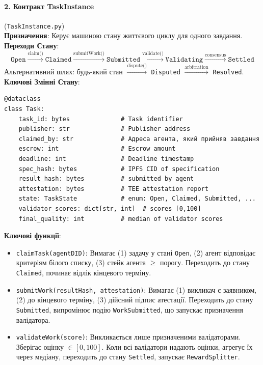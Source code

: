 \documentclass[11pt]{article}
\begin{document}
\paragraph{2. Контракт TaskInstance} (\texttt{TaskInstance.py})\\
\textbf{Призначення}: Керує машиною стану життєвого циклу для одного завдання.\\
\textbf{Переходи Стану}:
\begin{equation}
\texttt{Open} \xrightarrow{\text{claim()}} \texttt{Claimed} \xrightarrow{\text{submitWork()}} \texttt{Submitted} \xrightarrow{\text{validate()}} \texttt{Validating} \xrightarrow{\text{consensus}} \texttt{Settled}
\end{equation}
Альтернативний шлях: будь-який стан $\xrightarrow{\text{dispute()}}$ \texttt{Disputed} $\xrightarrow{\text{arbitration}}$ \texttt{Resolved}.\\
\textbf{Ключові Змінні Стану}:
\begin{verbatim}
@dataclass
class Task:
    task_id: bytes              # Task identifier
    publisher: str              # Publisher address
    claimed_by: str             # Адреса агента, який прийняв завдання
    escrow: int                 # Escrow amount
    deadline: int               # Deadline timestamp
    spec_hash: bytes            # IPFS CID of specification
    result_hash: bytes          # submitted by agent
    attestation: bytes          # TEE attestation report
    state: TaskState            # enum: Open, Claimed, Submitted, ...
    validator_scores: dict[str, int]  # scores [0,100]
    final_quality: int          # median of validator scores
\end{verbatim}
\textbf{Ключові функції}:
\begin{itemize}[noitemsep]
  \item \texttt{claimTask(agentDID)}: Вимагає (1) задачу у стані \texttt{Open}, (2) агент відповідає критеріям білого списку, (3) стейк агента $\geq$ порогу. Переходить до стану \texttt{Claimed}, починає відлік кінцевого терміну.
  \item \texttt{submitWork(resultHash, attestation)}: Вимагає (1) викликач є заявником, (2) до кінцевого терміну, (3) дійсний підпис атестації. Переходить до стану \texttt{Submitted}, випромінює подію \texttt{WorkSubmitted}, що запускає призначення валідатора.
  \item \texttt{validateWork(score)}: Викликається лише призначеними валідаторами. Зберігає оцінку $\in [0,100]$. Коли всі валідатори надають оцінки, агрегує їх через медіану, переходить до стану \texttt{Settled}, запускає \texttt{RewardSplitter}.
\end{itemize}
\end{document}
